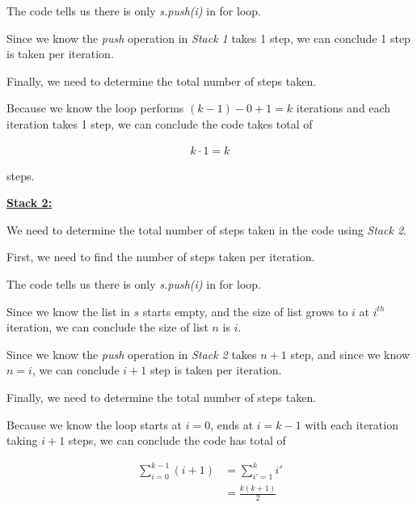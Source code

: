 \documentclass[12pt]{article}
\begin{document}
\begin{enumerate}[a.]
    \bigskip

    The code tells us there is only \textit{s.push(i)} in for loop.

    \bigskip

    Since we know the \textit{push} operation in \textit{Stack 1} takes 1 step,
    we can conclude 1 step is taken per iteration.

    \bigskip

    Finally, we need to determine the total number of steps taken.

    \bigskip

    Because we know the loop performs $(k-1) - 0 + 1 = k$ iterations and each
    iteration takes 1 step, we can conclude the code takes total of

    \begin{align}
        k \cdot 1 = k
    \end{align}

    steps.

    \bigskip

    \underline{\textbf{Stack 2:}}

    \bigskip

    We need to determine the total number of steps taken in the code using \textit{Stack 2}.

    \bigskip

    First, we need to find the number of steps taken per iteration.

    \bigskip

    The code tells us there is only \textit{s.push(i)} in for loop.

    \bigskip

    Since we know the list in $s$ starts empty, and the size of list grows to $i$ at $i^{th}$
    iteration, we can conclude the size of list $n$ is $i$.

    \bigskip

    Since we know the \textit{push} operation in \textit{Stack 2} takes $n+1$ step,
    and since we know $n = i$, we can conclude $i+1$ step is taken per iteration.

    \bigskip

    Finally, we need to determine the total number of steps taken.

    \bigskip

    Because we know the loop starts at $i = 0$, ends at $i = k-1$ with each iteration
    taking $i+1$ steps, we can conclude the code has total of

    \setcounter{equation}{0}
    \begin{align}
        \sum\limits_{i=0}^{k-1} (i+1) &= \sum\limits_{i'=1}^k i'\\
        &= \frac{k(k+1)}{2}
    \end{align}


\end{enumerate}
\end{document}
